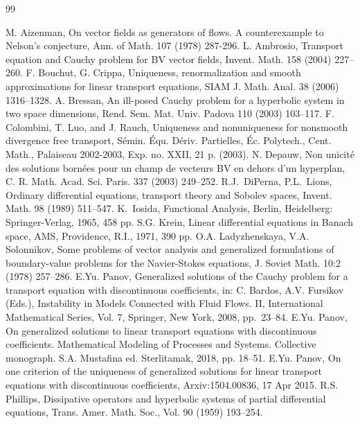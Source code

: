 \documentclass[12pt]{article}
\numberwithin{equation}{section}
\theoremstyle{plain}
\theoremstyle{definition}
\begin{document}
\begin{thebibliography}{99}

M. Aizenman, On vector fields as generators of flows. A counterexample
to Nelson's conjecture, Ann. of Math. 107 (1978) 287-296.
L. Ambrosio, Transport equation and Cauchy problem for BV vector
fields, Invent. Math. 158 (2004) 227--260.
F. Bouchut, G. Crippa, Uniqueness, renormalization and smooth
approximations for linear transport equations, SIAM J. Math. Anal. 38 (2006) 1316--1328.
A. Bressan, An ill-posed Cauchy problem for a hyperbolic system in two
space dimensions, Rend. Sem. Mat. Univ. Padova 110 (2003) 103--117.
F. Colombini, T. Luo, and J. Rauch, Uniqueness and nonuniqueness
for nonsmooth divergence free transport, S\'emin. \'Equ. D\'eriv. Partielles,
\'Ec. Polytech., Cent. Math., Palaiseau 2002-2003, Exp. no. XXII, 21 p.
(2003).
N. Depauw, Non unicit\'e des solutions born\'ees pour un champ de vecteurs BV en dehors d'un hyperplan,
C. R. Math. Acad. Sci. Paris. 337 (2003) 249--252.
R.J.~DiPerna, P.L.~Lions, Ordinary differential equations, transport
theory and Sobolev spaces, Invent. Math. 98 (1989) 511--547.
 K.~Iosida, Functional Analysis, Berlin, Heidelberg: Springer-Verlag, 1965, 458 pp.
S.G. Krein, Linear differential equations in Banach space, AMS, Providence, R.I., 1971, 390 pp.
O.A. Ladyzhenskaya, V.A. Solonnikov, Some problems of vector analysis and generalized formulations of boundary-value problems for the Navier-Stokes equations, J. Soviet Math. 10:2 (1978) 257--286.
E.Yu. Panov, Generalized solutions of the Cauchy problem for a transport equation
with discontinuous coefficients, in: C. Bardos, A.V. Fursikov (Eds.), Instability in Models Connected with Fluid Flows. II, International Mathematical Series, Vol. 7, Springer, New York, 2008, pp.~23--84.
E.Yu. Panov, On generalized solutions to linear transport equations with
discontinuous coefficients. Mathematical Modeling of Processes and Systems. Collective monograph. S.A. Mustafina ed. Sterlitamak, 2018, pp. 18--51.
E.Yu. Panov, On one criterion of the uniqueness of generalized solutions for linear
transport equations with discontinuous coefficients, Arxiv:1504.00836, 17 Apr
2015.
R.S. Phillips, Dissipative operators and hyperbolic systems of partial differential equations, Trans. Amer. Math. Soc., Vol. 90 (1959) 193--254.
\end{thebibliography}
\end{document}
